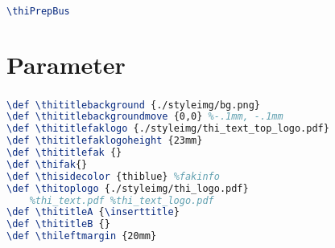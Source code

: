 \documentclass[aspectratio=169]{beamer}
\begin{document}
\thiDefaults
\thiPrepBus
\subsection{\thifak}
\def \thititleB {\thifak}
\maketitle

\begin{frame}[fragile]
    \frametitle{\thifak}
    \begin{lstlisting}[language=TeX]
        \thiPrepBus
    \end{lstlisting}
\end{frame}

\thiDefaults
\section{Parameter}
\begin{frame}[fragile]
    \frametitle{\secname}
    \begin{lstlisting}[language=TeX]
\def \thititlebackground {./styleimg/bg.png}
\def \thititlebackgroundmove {0,0} %-.1mm, -.1mm
\def \thititlefaklogo {./styleimg/thi_text_top_logo.pdf}
\def \thititlefaklogoheight {23mm}
\def \thititlefak {}
\def \thifak{}
\def \thisidecolor {thiblue} %fakinfo
\def \thitoplogo {./styleimg/thi_logo.pdf}
    %thi_text.pdf %thi_text_logo.pdf
\def \thititleA {\inserttitle}
\def \thititleB {}
\def \thileftmargin {20mm} 
    \end{lstlisting}
\end{frame}
\end{document}
